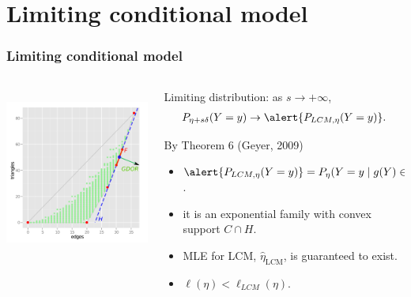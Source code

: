 \documentclass[ 10pt]{beamer}
\newcommand{\etaLCM}{\hat{\eta}_{\textrm{LCM}}}
\begin{document}
\section{Limiting conditional model}
\frame
{
	\frametitle{Limiting conditional model}
\begin{columns}[]
\begin{column}[T]{0.25\textwidth}
\includegraphics[height=2.2in,trim=3.5in 2in 0.15in 0.05in,clip=true]{g9-H.png}
\end{column} %

\begin{column}[t]{0.75\textwidth}
Limiting distribution: as $s \to +\infty$,
\begin{align*}
P_{\eta + s \delta}( Y = y) \to \alert{P_{LCM, \eta}( Y = y)}.
\end{align*}

\begin{block}{
By Theorem 6 (Geyer, 2009)}
\begin{itemize}
	\item $\alert{P_{LCM, \eta}( Y = y)} = P_{\eta}( Y =y \mid g(Y) \in H)$.
\vspace{1mm}
	
	\item it is an exponential family with convex support $C \cap H$.
\vspace{1mm}

	\item MLE for LCM, $\etaLCM$, is guaranteed to exist.
\vspace{1mm}

	\item $\ell(\eta) < \ell_{LCM}(\eta)$.
\end{itemize}
\end{block}

\end{column}
\end{columns}
}
\end{document}
